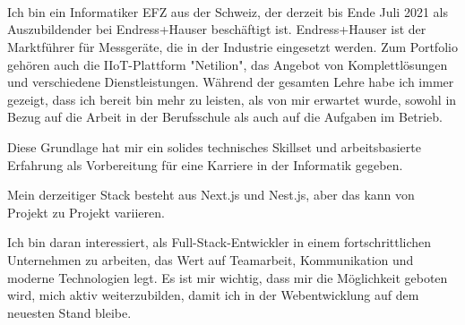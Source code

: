 \documentclass[9pt]{developercv} %
\begin{document}
\begin{minipage}[t]{0.23\textwidth} %
	\vspace{-\baselineskip} %
	
	\\
	\\
	\\
\end{minipage}

\vspace{0.5cm}



\begin{minipage}[t]{0.48\textwidth} %
	\vspace{-\baselineskip} %
	
  Ich bin ein Informatiker EFZ aus der Schweiz, der derzeit bis Ende Juli 2021 als Auszubildender bei Endress+Hauser beschäftigt ist. Endress+Hauser ist der Marktführer für Messgeräte, die in der Industrie eingesetzt werden. Zum Portfolio gehören auch die IIoT-Plattform "Netilion", das Angebot von Komplettlösungen und verschiedene Dienstleistungen. Während der gesamten Lehre habe ich immer gezeigt, dass ich bereit bin mehr zu leisten, als von mir erwartet wurde, sowohl in Bezug auf die Arbeit in der Berufsschule als auch auf die Aufgaben im Betrieb.
\end{minipage}
\hfill %
\begin{minipage}[t]{0.48\textwidth} %
	\vspace{-\baselineskip} %
  Diese Grundlage hat mir ein solides technisches Skillset und arbeitsbasierte Erfahrung als Vorbereitung für eine Karriere in der Informatik gegeben.

Mein derzeitiger Stack besteht aus Next.js und Nest.js, aber das kann von Projekt zu Projekt variieren.

Ich bin daran interessiert, als Full-Stack-Entwickler in einem fortschrittlichen Unternehmen zu arbeiten, das Wert auf Teamarbeit, Kommunikation und moderne Technologien legt. Es ist mir wichtig, dass mir die Möglichkeit geboten wird, mich aktiv weiterzubilden, damit ich in der Webentwicklung auf dem neuesten Stand bleibe.
\end{minipage}
\end{document}
